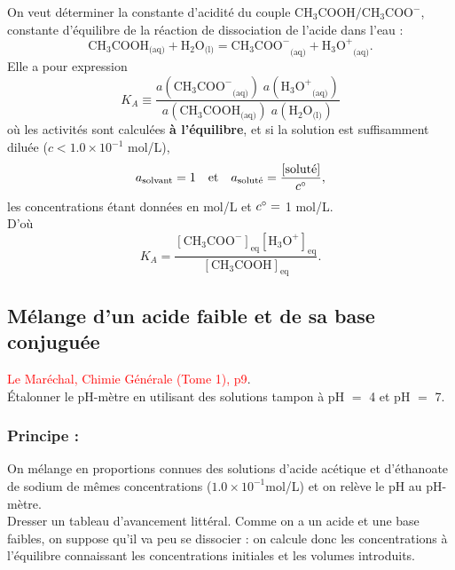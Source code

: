 \documentclass[11pt,a4paper]{report}
\begin{document}
On veut déterminer la constante d'acidité du couple $\text{CH}_3\text{COOH}/\text{CH}_3\text{COO}^-$, constante d'équilibre de la réaction de dissociation de l'acide dans l'eau :
\begin{equation}
	\boxed{\text{CH}_3\text{COOH}_\text{(aq)} + \text{H}_2\text{O}_\text{(l)} 
	= {\text{CH}_3\text{COO}^-}_\text{(aq)} + {\text{H}_3\text{O}^+}_\text{(aq)}}. 
\end{equation}
Elle a pour expression
\begin{equation}
	K_A \equiv 
	\frac{a({\text{CH}_3\text{COO}^-}_\text{(aq)})\;a({\text{H}_3\text{O}^+}_\text{(aq)})}
	{a(\text{CH}_3\text{COOH}_\text{(aq)})\;a(\text{H}_2\text{O}_\text{(l)})}
\end{equation}
où les activités sont calculées \textbf{à l'équilibre}, 
et si la solution est suffisamment diluée ($c < 1.0\times 10^{-1}$ mol/L),
\begin{equation}
	a_\text{solvant} = 1\quad\text{et}\quad a_\text{soluté} = \frac{[\text{soluté}]}{c\degree}, 
\end{equation}
les concentrations étant données en mol/L et $c\degree =$ 1 mol/L.\\

D'où
\begin{equation}
	\boxed{K_A = \frac{[{\text{CH}_3\text{COO}^-}]_\text{eq}[{\text{H}_3\text{O}^+}]_\text{eq}}
	{[\text{CH}_3\text{COOH}]_\text{eq}}}.
\end{equation}

\subsection{Mélange d'un acide faible et de sa base conjuguée}
\textcolor{red}{Le Maréchal, Chimie Générale (Tome 1), p9}.\\

Étalonner le pH-mètre en utilisant des solutions tampon à pH $=$ 4 et pH $=$ 7.

\subsubsection{Principe :}
On mélange en proportions connues des solutions d'acide acétique et d'éthanoate de sodium de mêmes concentrations ($1.0\times10^{-1}$\;mol/L) et on relève le pH au pH-mètre.\\

Dresser un tableau d'avancement littéral. Comme on a un acide et une base faibles, on suppose qu'il va peu se dissocier : on calcule donc les concentrations à l'équilibre connaissant les concentrations initiales et les volumes introduits.\\
\end{document}

